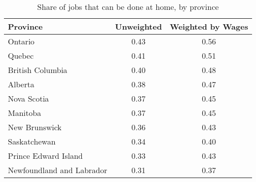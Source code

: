 \begin{table}[ht]
\centering
\caption{Share of jobs that can be done at home, by province} 
\label{tab:provinces}
\begin{tabular}{lcc}
  \hline
Province & Unweighted & Weighted by Wages \\ 
  \hline
Ontario & 0.43 & 0.56 \\ 
  Quebec & 0.41 & 0.51 \\ 
  British Columbia & 0.40 & 0.48 \\ 
  Alberta & 0.38 & 0.47 \\ 
  Nova Scotia & 0.37 & 0.45 \\ 
  Manitoba & 0.37 & 0.45 \\ 
  New Brunswick & 0.36 & 0.43 \\ 
  Saskatchewan & 0.34 & 0.40 \\ 
  Prince Edward Island & 0.33 & 0.43 \\ 
  Newfoundland and Labrador & 0.31 & 0.37 \\ 
   \hline
\end{tabular}
\end{table}
